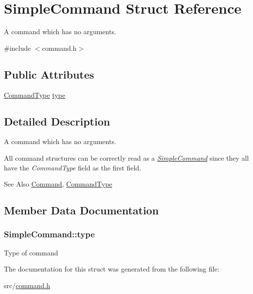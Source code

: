 \hypertarget{structSimpleCommand}{\section{Simple\-Command Struct Reference}
\label{structSimpleCommand}
}


A command which has no arguments.  




{\ttfamily \#include $<$command.\-h$>$}

\subsection*{Public Attributes}
\begin{DoxyCompactItemize}
\item 
\hyperlink{command_8h_a21e038f5b8958e203d28bc4f18472352}{Command\-Type} \hyperlink{structSimpleCommand_a9048c04ff50ab9364d56e04e5c3e8ee0}{type}
\end{DoxyCompactItemize}


\subsection{Detailed Description}
A command which has no arguments. 

All command structures can be correctly read as a {\itshape \hyperlink{structSimpleCommand}{Simple\-Command}} since they all have the {\itshape Command\-Type} field as the first field.

\begin{DoxySeeAlso}{See Also}
\hyperlink{unionCommand}{Command}, \hyperlink{command_8h_aa8311e0de296df9816965be35c31d925}{Command\-Type} 
\end{DoxySeeAlso}


\subsection{Member Data Documentation}
\hypertarget{structSimpleCommand_a9048c04ff50ab9364d56e04e5c3e8ee0}{
\subsubsection[{type}]{ Simple\-Command\-::type}}\label{structSimpleCommand_a9048c04ff50ab9364d56e04e5c3e8ee0}
Type of command 

The documentation for this struct was generated from the following file\-:\begin{DoxyCompactItemize}
\item 
src/\hyperlink{command_8h}{command.\-h}\end{DoxyCompactItemize}
